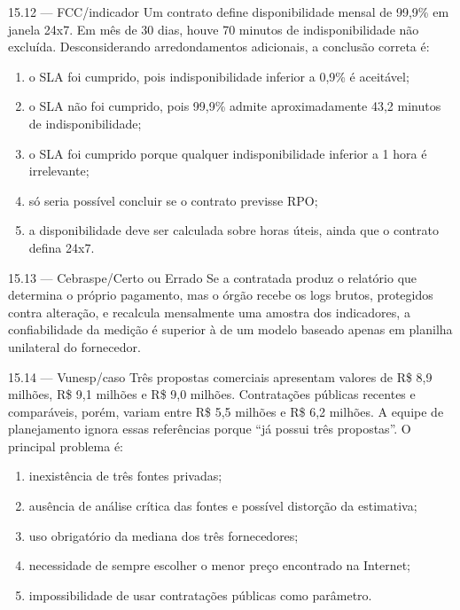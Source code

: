 \begin{questao}{ 15.12 — FCC/indicador}
Um contrato define disponibilidade mensal de 99,9\% em janela 24x7. Em mês de 30 dias, houve 70 minutos de indisponibilidade não excluída. Desconsiderando arredondamentos adicionais, a conclusão correta é:
\begin{enumerate}[label=\Alph*)]
\item o SLA foi cumprido, pois indisponibilidade inferior a 0,9\% é aceitável;
\item o SLA não foi cumprido, pois 99,9\% admite aproximadamente 43,2 minutos de indisponibilidade;
\item o SLA foi cumprido porque qualquer indisponibilidade inferior a 1 hora é irrelevante;
\item só seria possível concluir se o contrato previsse RPO;
\item a disponibilidade deve ser calculada sobre horas úteis, ainda que o contrato defina 24x7.
\end{enumerate}
\end{questao}

\begin{questao}{ 15.13 — Cebraspe/Certo ou Errado}
Se a contratada produz o relatório que determina o próprio pagamento, mas o órgão recebe os logs brutos, protegidos contra alteração, e recalcula mensalmente uma amostra dos indicadores, a confiabilidade da medição é superior à de um modelo baseado apenas em planilha unilateral do fornecedor.
\end{questao}

\begin{questao}{ 15.14 — Vunesp/caso}
Três propostas comerciais apresentam valores de R\$ 8,9 milhões, R\$ 9,1 milhões e R\$ 9,0 milhões. Contratações públicas recentes e comparáveis, porém, variam entre R\$ 5,5 milhões e R\$ 6,2 milhões. A equipe de planejamento ignora essas referências porque ``já possui três propostas''. O principal problema é:
\begin{enumerate}[label=\Alph*)]
\item inexistência de três fontes privadas;
\item ausência de análise crítica das fontes e possível distorção da estimativa;
\item uso obrigatório da mediana dos três fornecedores;
\item necessidade de sempre escolher o menor preço encontrado na Internet;
\item impossibilidade de usar contratações públicas como parâmetro.
\end{enumerate}
\end{questao}

